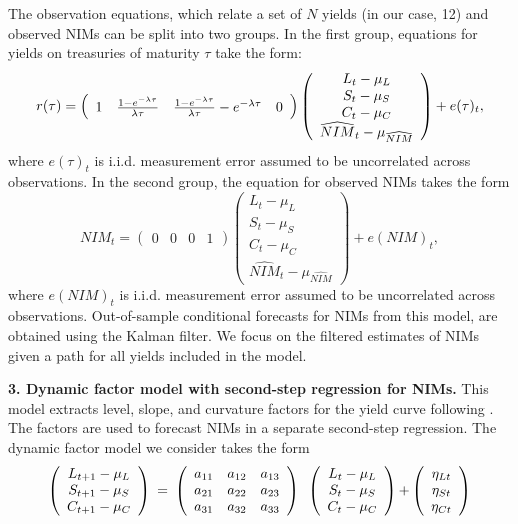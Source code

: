 \documentclass[11pt]{article}
\begin{document}
The observation equations, which relate a set of $N$ yields (in our case, 12) and observed NIMs can be split into two groups. In the first group, equations for yields on treasuries of maturity $\tau $ take the form:
\[
r(\tau )=\left(
\begin{array}{cccc}
1 & \frac{1-e^{-\lambda \tau }}{\lambda \tau } & \frac{1-e^{-\lambda \tau }}{%
\lambda \tau }-e^{-\lambda \tau } & 0%
\end{array}%
\right) \left(
\begin{array}{c}
{L_{t}-\mu _{L}} \\
{S_{t}-\mu _{S}} \\
{C_{t}-\mu _{C}} \\
\widehat{NIM}_{t}-\mu _{\widehat{NIM}}%
\end{array}%
\right) +e(\tau )_{t},
\]%
where $e(\tau )_{t}$ is i.i.d. measurement error assumed to be uncorrelated
across observations. \bigskip In the second group, the equation for observed
NIMs takes the form%
\[
NIM_{t}=\left(
\begin{array}{cccc}
0 & 0 & 0 & 1%
\end{array}%
\right) \left(
\begin{array}{c}
{L_{t}-\mu _{L}} \\
{S_{t}-\mu _{S}} \\
{C_{t}-\mu _{C}} \\
\widehat{NIM}_{t}-\mu _{\widehat{NIM}}%
\end{array}%
\right) +e(NIM)_{t},
\]
where $e(NIM)_{t}$ is i.i.d. measurement error assumed to be uncorrelated across observations. Out-of-sample conditional forecasts for NIMs from this model, are obtained using the Kalman filter. We focus on the filtered estimates of NIMs given a path for all yields included in the model.

\noindent \textbf{3. Dynamic factor model with second-step regression for NIMs.} This model extracts level, slope, and curvature factors for the yield curve following . The factors are used to forecast NIMs in a separate second-step regression. The dynamic factor model we consider takes the form
\[
\left(
\begin{array}{c}
{L_{t+1}-\mu _{L}} \\
{S_{t+1}-\mu _{S}} \\
{C_{t+1}-\mu _{C}}%
\end{array}%
\right) {\normalsize \ =\ }\left(
\begin{array}{ccc}
a_{11} & a_{12} & a_{13} \\
a_{21} & a_{22} & a_{23} \\
a_{31} & a_{32} & a_{33}%
\end{array}%
\right) {\normalsize \ }\left(
\begin{array}{c}
{L_{t}-\mu _{L}} \\
{S_{t}-\mu _{S}} \\
{C_{t}-\mu _{C}}%
\end{array}%
\right) {\normalsize +}\left(
\begin{array}{c}
{\eta _{Lt}} \\
{\eta _{St}} \\
{\eta _{Ct}}%
\end{array}%
\right)
\]
\end{document}
